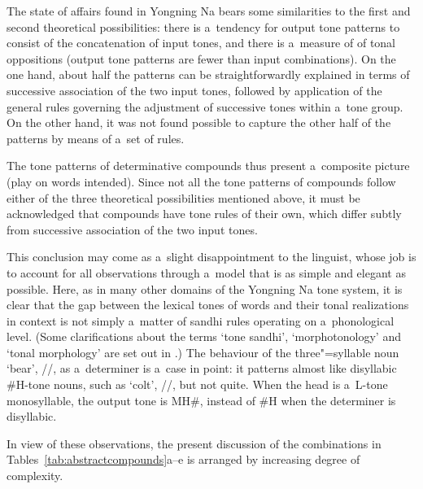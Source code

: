 The state of
affairs found in Yongning Na bears some similarities to the first and second theoretical possibilities: there is a~tendency for output tone patterns to consist of the concatenation of input tones, and there is a~measure of  of tonal oppositions (output tone patterns are fewer than input combinations). On the one hand, about half the patterns can be straightforwardly explained in terms of successive association of the two input tones, followed by
application of the general rules governing the adjustment of successive tones within a~tone
group. On the other hand, it was not found possible to capture the other half of the patterns by
means of a~set of rules.

The tone patterns of determinative compounds thus present a~composite picture (play on words intended). Since not all the tone patterns of compounds follow either of the three theoretical possibilities mentioned above, it must be acknowledged that compounds have tone rules of their own, which differ subtly from successive association of the two input tones. 

This conclusion may come as a~slight disappointment to the linguist, whose job is to
account for all observations through a~model that is as simple and elegant as possible. Here, as
in many other domains of the Yongning Na tone system, it is clear that the gap between the lexical tones of
words and their tonal realizations in context is not simply a~matter of sandhi rules operating on
a~phonological level. (Some clarifications about the terms ‘{tone sandhi}’, ‘morphotonology’ and ‘tonal morphology’ are set out in .) The behaviour of the three"=syllable noun ‘bear’, //, as
a~determiner is a~case in point: it patterns almost like disyllabic \#H-tone nouns, such as ‘colt’,
//, but not quite. When the head is a~L-tone {monosyllable}, the output tone is MH\#,
instead of \#H when the determiner is disyllabic.

In view of these observations, the present discussion of the combinations in Tables~\ref{tab:abstractcompounds}a--e is arranged by increasing degree of complexity. 

